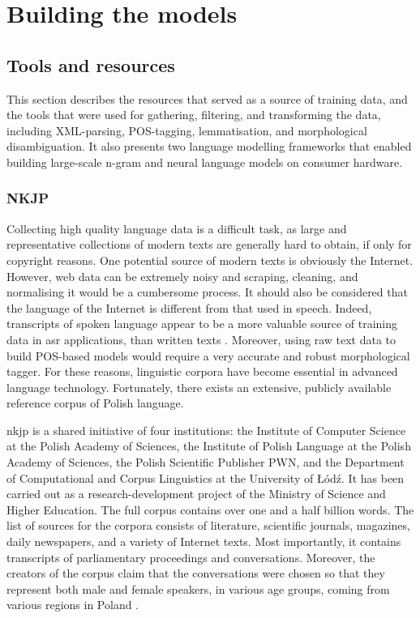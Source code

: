 \chapter{Building the models}
\label{chapter:tools}
\section{Tools and resources}
This section describes the resources that served as a source of training data, and the tools that were used for gathering, filtering, and transforming the data, including \mbox{XML-parsing,} \mbox{POS-tagging,} lemmatisation, and morphological disambiguation. It also presents two language modelling frameworks that enabled building large-scale n-gram and neural language models on consumer hardware.
\subsection{NKJP}
\label{section:nkjp}
Collecting high quality language data is a difficult task, as large and representative collections of modern texts are generally hard to obtain, if only for copyright reasons. One potential source of modern texts is obviously the Internet. However, web data can be extremely noisy and scraping, cleaning, and normalising it would be a cumbersome process. It should also be considered that the language of the Internet is different from that used in speech. Indeed, transcripts of spoken language appear to be a more valuable source of training data in \gls{asr} applications, than written texts \cite{dziadzio2015comparison}. Moreover, using raw text data to build POS-based models would require a very accurate and robust morphological tagger. For these reasons, linguistic corpora have become essential in advanced language technology. Fortunately, there exists an extensive, publicly available reference corpus of Polish language.

\gls{nkjp} is a shared initiative of four institutions: the Institute of Computer Science at the Polish Academy of Sciences, the Institute of Polish Language at the Polish Academy of Sciences, the Polish Scientific Publisher PWN, and the Department of Computational and Corpus Linguistics at the University of Łódź. It has been carried out as a research-development project of the Ministry of Science and Higher Education. The full corpus contains over one and a half billion words. The list of sources for the corpora consists of literature, scientific journals, magazines, daily newspapers, and a variety of Internet texts. Most importantly, it contains transcripts of parliamentary proceedings and conversations. Moreover, the creators of the corpus claim that the conversations were chosen so that they represent both male and female speakers, in various age groups, coming from various regions in Poland \cite{lewandowska2012narodowy}.

